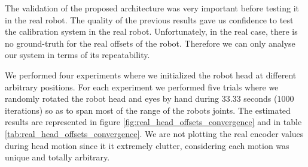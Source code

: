 The validation of the proposed architecture was very important before testing it in the real robot. The quality of the previous results gave us confidence to test the calibration system in the real robot. Unfortunately, in the real case, there is no ground-truth for the real offsets of the robot. Therefore we can only analyse our system in terms of its repeatability. 

We performed four experiments where we initialized the robot head at different arbitrary positions. For each experiment we performed five trials where we randomly rotated the robot head and eyes by hand during $33.33$ seconds ($1000$ iterations) so as to span most of the range of the robots joints. The estimated results are represented in figure \ref{fig:real_head_offsets_convergence} and in table \ref{tab:real_head_offsets_convergence}. We are not plotting the real encoder values during head motion since it it extremely clutter, considering each motion was unique and totally arbitrary.

